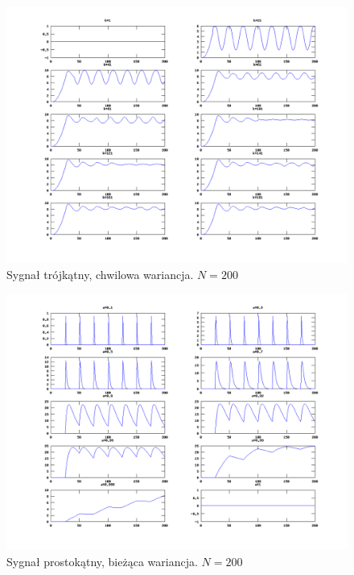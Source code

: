 \documentclass[wide,a4paper,titlepage,12pt]{mwart}
\begin{document}
      \begin{landscape}
        \begin{figure}[htbp]
          \begin{center}
            \includegraphics[scale=.5]{out/Figure9.png}
            \caption{\label{wykres9}Sygnał trójkątny, chwilowa wariancja. $N=200$}
          \end{center}
        \end{figure}
      \end{landscape}

      \begin{landscape}
        \begin{figure}[htbp]
          \begin{center}
            \includegraphics[scale=.5]{out/Figure10.png}
            \caption{\label{wykres10}Sygnał prostokątny, bieżąca wariancja. $N=200$}
          \end{center}
        \end{figure}
      \end{landscape}
\end{document}
